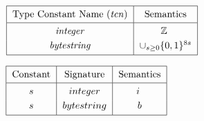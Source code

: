 \documentclass[../plutus-core-specification.tex]{subfiles}
\begin{document}
\vspace{1cm}


\begin{minipage}{\linewidth}
\centering

    \(\begin{tabular}{|c|c|}\hline
    \Strut
        \textrm{Type Constant Name (\textit{tcn})} & \textrm{Semantics}\\
        \hline
        \textit{integer} & $\mathbb{Z}$ \rule{0mm}{4mm}  \\[3pt]
        \textit{bytestring} & $\cup_{s \ge 0}\{0,1\}^{8s}$\\[3pt]
        \hline
   \end{tabular}\)
   \label{fig:type-constants}

\end{minipage}
\vspace{1cm}



\begin{minipage}{\linewidth}
\centering
   \(\begin{tabular}{|c|c|c|}\hline
    \Strut
        \textrm{Constant} & \textrm{Signature} & \textrm{Semantics}\\
        \hline
        $s$   & $\constsig{integer}$  &$i$ \rule{0mm}{4mm} \\[3pt]
        $s$   & $\constsig{bytestring}$ & $b$\\[3pt]
        \hline
    \end{tabular}\)
    \label{fig:constants}
\end{minipage}

\end{document}
